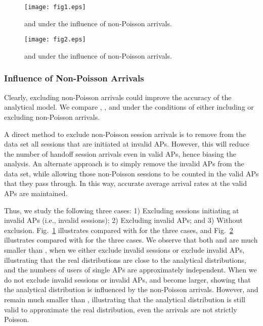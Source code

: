 \begin{figure}[tbp]
\centering
\texttt{[image: fig1.eps]}
\caption{ and  under the influence of non-Poisson arrivals.}
\label{result1}
\end{figure}

\begin{figure}[tbp]
\centering
\texttt{[image: fig2.eps]}
\caption{ and  under the influence of non-Poisson arrivals.}
\label{result2}
\end{figure}




\subsubsection{Influence of Non-Poisson Arrivals} \label{sec:EffectNon-Poisson}

Clearly, excluding non-Poisson arrivals could improve the accuracy of the analytical model.
We compare , , and  under the conditions of either including or excluding non-Poisson arrivals.

A direct method to exclude non-Poisson session arrivals is to remove from the data set all sessions that are initiated at invalid APs.  However, this will reduce the number of handoff session arrivals even in valid APs, hence biasing the analysis.  An alternate approach is to simply remove the invalid APs from the data set, while allowing those non-Poisson sessions to be counted in the valid APs that they pass through. In this way, accurate average arrival rates at the valid APs are maintained.

Thus, we study the following three cases: 1) Excluding sessions initiating at invalid APs (i.e., invalid sessions); 2) Excluding invalid APs; and  3) Without exclusion.  Fig.~\ref{result1} illustrates  compared with  for the three cases, and
Fig.~\ref{result2} illustrates  compared with   for the three cases.
{We observe that both  and  are much smaller than , when we either exclude invalid sessions or exclude invalid APs, illustrating that the real distributions are close to the analytical distributions,} and the numbers of users of single APs are approximately independent.
When we do not exclude invalid sessions or invalid APs,  and  become larger, showing that the analytical distribution is influenced by the non-Poisson arrivals. {However,  and  remain much smaller than , illustrating that the analytical distribution is still valid to approximate the real distribution,}  even the arrivals are not strictly Poisson.

